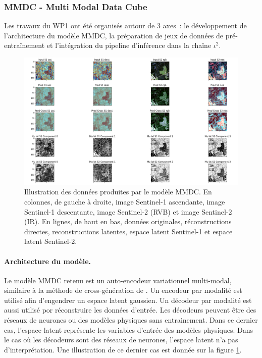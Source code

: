 \subsubsection{MMDC - Multi Modal Data Cube}
\label{subsec:mmdc}
Les travaux du WP1 ont été organisés autour de 3 axes : le développement de l’architecture du modèle MMDC, la préparation de jeux de données de pré-entraînement et l’intégration du pipeline d’inférence dans la chaîne $\iota^2$.
\begin{figure}[htbp]
\begin{center}
\includegraphics[width=\columnwidth]{img/wp1/mmdc5.png}
\caption{Illustration des données produites par le modèle MMDC. En colonnes, de gauche à droite, image Sentinel-1 ascendante, image Sentinel-1 descentante, image Sentinel-2 (RVB) et image Sentinel-2 (IR). En lignes, de haut en bas, données originales, réconstructions directes, reconstructions latentes, espace latent Sentinel-1 et espace latent Sentinel-2.}
\label{fig:mmdcresults}
\end{center}
\end{figure}

\paragraph{Architecture du modèle.}
Le modèle MMDC retenu est un auto-encodeur variationnel multi-modal, similaire à la méthode de cross-génération de \cite{shi-2019-variat-mixtur}. Un encodeur par modalité est utilisé afin d’engendrer un espace latent gaussien. Un décodeur par modalité est aussi utilisé por réconstruire les données d’entrée. Les décodeurs peuvent être des réseaux de neurones ou des modèles physiques sans entrainement. Dans ce dernier cas, l’espace latent représente les variables d’entrée des modèles physiques. Dans le cas où les décodeurs sont des réseaux de neurones, l’espace latent n’a pas d’interprétation. Une illustration de ce dernier cas est donnée sur la figure \ref{fig:mmdcresults}.

